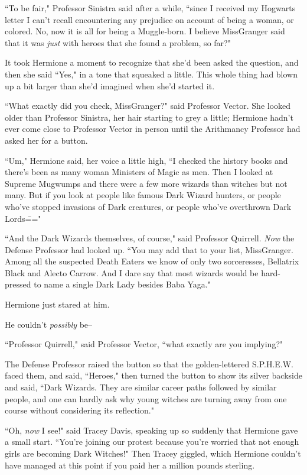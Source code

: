 ``To be fair," Professor Sinistra said after a while, ``since I received my Hogwarts letter I can't recall encountering any prejudice on account of being a woman, or colored. No, now it is all for being a Muggle-born. I believe Miss\?Granger said that it was \emph{just} with heroes that she found a problem, so far?"

It took Hermione a moment to recognize that she'd been asked the question, and then she said ``Yes," in a tone that squeaked a little. This whole thing had blown up a bit larger than she'd imagined when she'd started it.

``What exactly did you check, Miss\?Granger?" said Professor Vector. She looked older than Professor Sinistra, her hair starting to grey a little; Hermione hadn't ever come close to Professor Vector in person until the Arithmancy Professor had asked her for a button.

``Um," Hermione said, her voice a little high, ``I checked the history books and there's been as many woman Ministers of Magic as men. Then I looked at Supreme Mugwumps and there were a few more wizards than witches but not many. But if you look at people like famous Dark Wizard hunters, or people who've stopped invasions of Dark creatures, or people who've overthrown Dark Lords\==="

``And the Dark Wizards themselves, of course," said Professor Quirrell. \emph{Now} the Defense Professor had looked up. ``You may add that to your list, Miss\?Granger. Among all the suspected Death Eaters we know of only two sorceresses, Bellatrix Black and Alecto Carrow. And I dare say that most wizards would be hard-pressed to name a single Dark Lady besides Baba Yaga."

Hermione just stared at him.

He couldn't \emph{possibly} be\---

``Professor Quirrell," said Professor Vector, ``what exactly are you implying?"

The Defense Professor raised the button so that the golden-lettered S.P.H.E.W. faced them, and said, ``Heroes," then turned the button to show its silver backside and said, ``Dark Wizards. They are similar career paths followed by similar people, and one can hardly ask why young witches are turning away from one course without considering its reflection."

``Oh, \emph{now} I see!" said Tracey Davis, speaking up so suddenly that Hermione gave a small start. ``You're joining our protest because you're worried that not enough girls are becoming Dark Witches!" Then Tracey giggled, which Hermione couldn't have managed at this point if you paid her a million pounds sterling.

